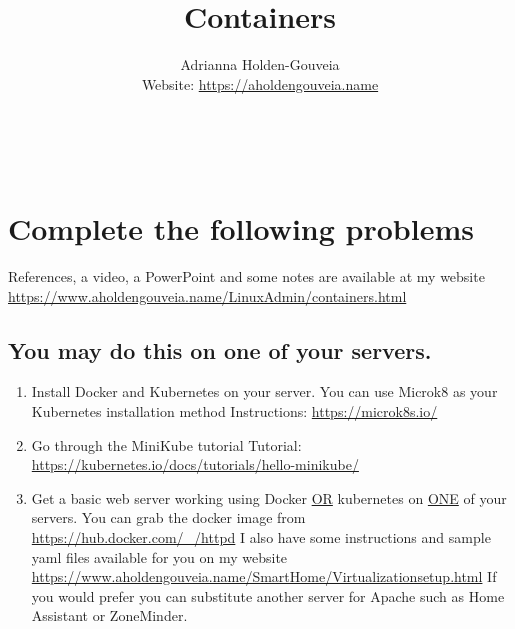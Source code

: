 \documentclass[12pt]{article}
\title{Containers}
\author{
        Adrianna Holden-Gouveia \\
        Website: \url{https://aholdengouveia.name}\\ 
        \date{\vspace{-5ex}}
        \faLinkedin{: aholdengouveia} \\
        \faGithub {: aholdengouveia} \\
        }
\begin{document}
    

\maketitle




\section*{Complete the following problems}

References, a video, a PowerPoint and some notes are available at my website
\url {https://www.aholdengouveia.name/LinuxAdmin/containers.html}

\subsection*{You may do this on one of your servers.}
    \begin{enumerate}
        \item Install Docker and Kubernetes on your server.  
            \subitem You can use Microk8 as your Kubernetes installation method  
            \subitem Instructions: \url{https://microk8s.io/}
        \item Go through the MiniKube tutorial
            \subitem Tutorial: \url{https://kubernetes.io/docs/tutorials/hello-minikube/}
        \item Get a basic web server working using Docker \underline{OR} kubernetes on \underline{ONE} of your servers. 
            \subitem You can grab the docker image from \url{https://hub.docker.com/_/httpd}  
            \subitem I also have some instructions and sample yaml files available for you on my website \url{https://www.aholdengouveia.name/SmartHome/Virtualizationsetup.html}  
            \subitem If you would prefer you can substitute another server for Apache such as Home Assistant or ZoneMinder.
    \end{enumerate}
\end{document}
